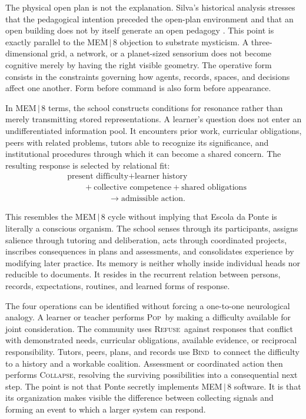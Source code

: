 \documentclass[11pt]{article}
\newcommand{\Pop}{\textsc{Pop}}
\newcommand{\Refuse}{\textsc{Refuse}}
\newcommand{\Bind}{\textsc{Bind}}
\newcommand{\Collapse}{\textsc{Collapse}}
\begin{document}
The physical open plan is not the explanation. Silva's historical analysis stresses that the pedagogical intention preceded the open-plan environment and that an open building does not by itself generate an open pedagogy \cite{silva2020}. This point is exactly parallel to the MEM\,$|$\,8 objection to substrate mysticism. A three-dimensional grid, a network, or a planet-sized sensorium does not become cognitive merely by having the right visible geometry. The operative form consists in the constraints governing how agents, records, spaces, and decisions affect one another. Form before command is also form before appearance.

In MEM\,$|$\,8 terms, the school constructs conditions for resonance rather than merely transmitting stored representations. A learner's question does not enter an undifferentiated information pool. It encounters prior work, curricular obligations, peers with related problems, tutors able to recognize its significance, and institutional procedures through which it can become a shared concern. The resulting response is selected by relational fit:
\[
\begin{aligned}
&\text{present difficulty}+\text{learner history} \\
&\qquad +\text{collective competence}+\text{shared obligations} \\
&\hspace{5em}\longrightarrow \text{admissible action}.
\end{aligned}
\]

This resembles the MEM\,$|$\,8 cycle without implying that Escola da Ponte is literally a conscious organism. The school senses through its participants, assigns salience through tutoring and deliberation, acts through coordinated projects, inscribes consequences in plans and assessments, and consolidates experience by modifying later practice. Its memory is neither wholly inside individual heads nor reducible to documents. It resides in the recurrent relation between persons, records, expectations, routines, and learned forms of response.

The four operations can be identified without forcing a one-to-one neurological analogy. A learner or teacher performs \Pop\ by making a difficulty available for joint consideration. The community uses \Refuse\ against responses that conflict with demonstrated needs, curricular obligations, available evidence, or reciprocal responsibility. Tutors, peers, plans, and records use \Bind\ to connect the difficulty to a history and a workable coalition. Assessment or coordinated action then performs \Collapse, resolving the surviving possibilities into a consequential next step. The point is not that Ponte secretly implements MEM\,$|$\,8 software. It is that its organization makes visible the difference between collecting signals and forming an event to which a larger system can respond.
\end{document}
